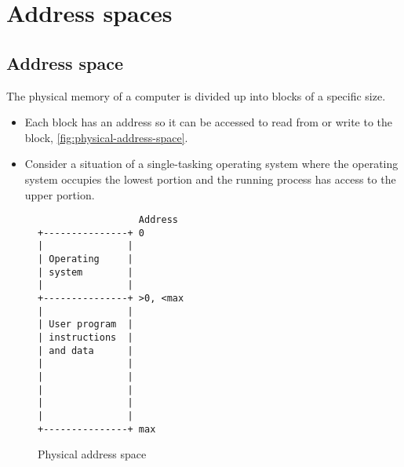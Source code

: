 \chapter{Address spaces}
\label{ch:address-spaces}



\section{Address space}

The physical memory of a computer is divided up into blocks of a specific size.
\begin{itemize}
\item Each block has an address so it can be accessed to read from or write to the block, \autoref{fig:physical-address-space}.
\item Consider a situation of a single-tasking operating system where the operating system occupies the lowest portion and the running process has access to the upper portion.
\end{itemize} 

\begin{figure}[htbp]
  \centering
\begin{verbatim}
                  Address
+---------------+ 0
|               |
| Operating     |
| system        |
|               |
+---------------+ >0, <max
|               |
| User program  |
| instructions  |
| and data      |
|               |
|               |
|               |
|               |
|               |
+---------------+ max
\end{verbatim}
  \caption{Physical address space}
  \label{fig:physical-address-space}
\end{figure}


